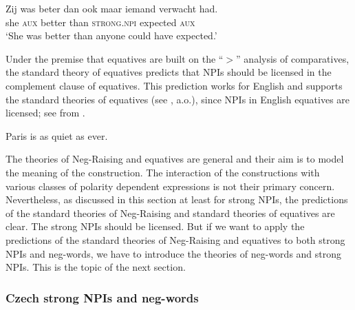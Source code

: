 \documentclass[output=paper,colorlinks,citecolor=brown]{langscibook}
\begin{document}
\ea\label{ex-19} \gll Zij was beter dan {ook maar iemand} verwacht had.\\
she \textsc{aux} better than \textsc{strong.npi} expected \textsc{aux}\\
\glt `She was better than anyone could have expected.'
\z

\noindent Under the premise that equatives are built on the ``$>$'' analysis of comparatives, the standard theory of equatives predicts that NPIs should be licensed in the complement clause of equatives. This prediction works for English and supports the standard theories of equatives (see \cite{stechow1984comparing,beck_comparison_nodate}, a.o.), since NPIs in English equatives are licensed; see  from \citet{seuren1984comparative}.

\ea\label{ex-5} Paris is as quiet as ever.
\z


\noindent The theories of Neg-Raising and equatives are general and their aim is to model the meaning of the construction. The interaction of the constructions with various classes of polarity dependent expressions is not their primary concern. Nevertheless, as discussed in this section at least for strong NPIs, the predictions of the standard theories of Neg-Raising and standard theories of equatives are clear. The strong NPIs should be licensed. But if we want to apply the predictions of the standard theories of Neg-Raising and equatives to both strong NPIs and neg-words, we have to introduce the theories of neg-words and strong NPIs. This is the topic of the next section.

\subsubsection{Czech strong NPIs and neg-words}\label{sec:theoretical-backgr-NPIs-neg-words}
\end{document}
